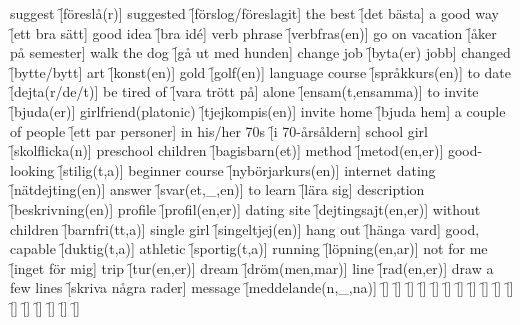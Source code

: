 \begin{questions}
    \begin{multicols}{2}
        \raggedcolumns
        \question suggest \f[föreslå(r)]
        \question suggested \f[förslog/föreslagit]
        \question the best \f[det bästa]
        \question a good way \f[ett bra sätt]
        \question good idea \f[bra id\'e]
        \question verb phrase \f[verbfras(en)]
        \question go on vacation \f[åker på semester]
        \question walk the dog \f[gå ut med hunden]
        \question change job \f[byta(er) jobb]
        \question changed \f[bytte/bytt]
        \question art \f[konst(en)]
        \question gold \f[golf(en)]
        \question language course \f[språkkurs(en)]
        \question to date \f[dejta(r/de/t)]
        \question be tired of \f[vara trött på]
        \question alone \f[ensam(t,ensamma)]
        \question to invite \f[bjuda(er)]
        \question girlfriend(platonic) \f[tjejkompis(en)]
        \question invite home \f[bjuda hem]
        \question a couple of people \f[ett par personer]
        \question in his/her 70s \f[i 70-årsåldern]
        \question school girl \f[skolflicka(n)]
        \question preschool children \f[bagisbarn(et)]
        \question method \f[metod(en,er)]
        \question good-looking \f[stilig(t,a)]
        \question beginner course \f[nybörjarkurs(en)]
        \question internet dating \f[nätdejting(en)]
        \question answer \f[svar(et,\_,en)]
        \question to learn \f[lära sig]
        \question description \f[beskrivning(en)]
        \question profile \f[profil(en,er)]
        \question dating site \f[dejtingsajt(en,er)]
        \question without children \f[barnfri(tt,a)]
        \question single girl \f[singeltjej(en)]
        \question hang out \f[hänga vard]
        \question good, capable \f[duktig(t,a)]
        \question athletic \f[sportig(t,a)]
        \question running \f[löpning(en,ar)]
        \question not for me \f[inget för mig]
        \question trip \f[tur(en,er)]
        \question dream \f[dröm(men,mar)]
        \question line \f[rad(en,er)]
        \question draw a few lines \f[skriva några rader]
        \question message \f[meddelande(n,\_,na)]
        \question  \f[]
        \question  \f[]
        \question  \f[]
        \question  \f[]
        \question  \f[]
        \question  \f[]
        \question  \f[]
        \question  \f[]
        \question  \f[]
        \question  \f[]
        \question  \f[]
        \question  \f[]
        \question  \f[]
        \question  \f[]
        \question  \f[]
        \question  \f[]
        \question  \f[]

\end{multicols}
\end{questions}
